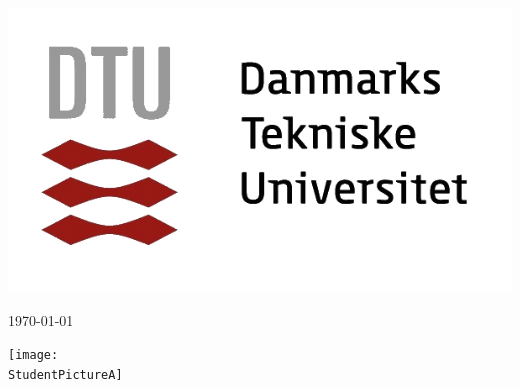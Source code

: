 

\begin{titlepage}
	\centering
	\includegraphics[scale=0.3]{Forsider/DTUlogo.png}\par
	\vspace{0.5cm}
	{\LARGE \CourseNumber \par}
	{\LARGE \Course \par}
	\vspace{1.5cm}
	{\textbf{\Huge \ProjectName}\par} %
	{\today\par} %
	\vspace{3cm}
    \texttt{[image: \\StudentPictureA]}\par
    \vspace{1cm}
    {\Large\StudentNumberA \- \StudentNameA}
	\end{titlepage}
